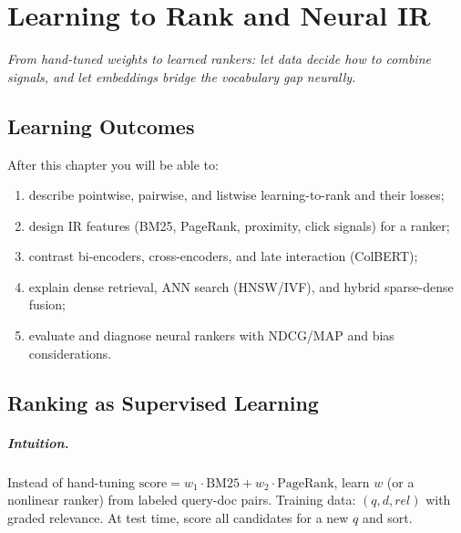 \chapter{Learning to Rank and Neural IR}\label{ch:neural}
\begin{center}\small\textit{From hand-tuned weights to learned rankers: let data decide how to combine signals, and let embeddings bridge the vocabulary gap neurally.}\end{center}

\noindent{}
\vspace{0.4em}

\section*{Learning Outcomes}
After this chapter you will be able to:
\begin{enumerate}[label=(L\arabic*)]
  \item describe pointwise, pairwise, and listwise learning-to-rank and their losses;
  \item design IR features (BM25, PageRank, proximity, click signals) for a ranker;
  \item contrast bi-encoders, cross-encoders, and late interaction (ColBERT);
  \item explain dense retrieval, ANN search (HNSW/IVF), and hybrid sparse-dense fusion;
  \item evaluate and diagnose neural rankers with NDCG/MAP and bias considerations.
\end{enumerate}

\section{Ranking as Supervised Learning}\label{sec:ltr}
\paragraph{Intuition.} Instead of hand-tuning $\text{score}=w_1\cdot\text{BM25}+w_2\cdot\text{PageRank}$, learn $w$ (or a nonlinear ranker) from labeled query-doc pairs. Training data: $(q,d, rel)$ with graded relevance. At test time, score all candidates for a new $q$ and sort.

